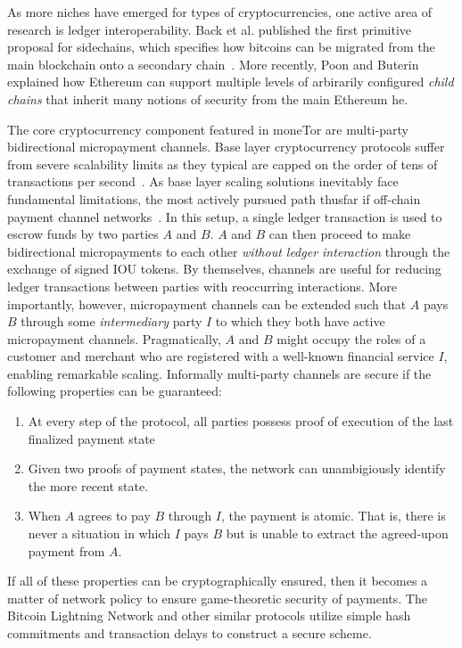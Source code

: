 As more niches have emerged for types of cryptocurrencies, one active area of
research is ledger interoperability. Back et al. published the first primitive
proposal for sidechains, which specifies how bitcoins can be migrated from the
main blockchain onto a secondary chain~\cite{back2014enabling}.  More recently,
Poon and Buterin explained how Ethereum can support multiple levels of
arbirarily configured \emph{child chains} that inherit many notions of security
from the main Ethereum he.

The core cryptocurrency component featured in moneTor are multi-party
bidirectional micropayment channels. Base layer cryptocurrency protocols suffer
from severe scalability limits as they typical are capped on the order of tens
of transactions per second~\cite{team2017blockchain}. As base layer scaling
solutions inevitably face fundamental limitations, the most actively pursued
path thusfar if off-chain payment channel networks~\cite{poon2016bitcoin}. In
this setup, a single ledger transaction is used to escrow funds by two parties
$A$ and $B$. $A$ and $B$ can then proceed to make bidirectional micropayments to
each other \emph{without ledger interaction} through the exchange of signed IOU
tokens. By themselves, channels are useful for reducing ledger transactions
between parties with reoccurring interactions. More importantly, however,
micropayment channels can be extended such that $A$ pays $B$ through some
\emph{intermediary} party $I$ to which they both have active micropayment
channels. Pragmatically, $A$ and $B$ might occupy the roles of a customer and
merchant who are registered with a well-known financial service $I$, enabling
remarkable scaling. Informally multi-party channels are secure if the following
properties can be guaranteed:

\begin{enumerate}
\item At every step of the protocol, all parties possess proof of execution of
  the last finalized payment state
\item Given two proofs of payment states, the network can unambigiously identify
  the more recent state.
\item When $A$ agrees to pay $B$ through $I$, the payment is atomic. That is,
  there is never a situation in which $I$ pays $B$ but is unable to extract the
  agreed-upon payment from $A$.
\end{enumerate}

If all of these properties can be cryptographically ensured, then it becomes a
matter of network policy to ensure game-theoretic security of payments.  The
Bitcoin Lightning Network and other similar protocols utilize simple hash
commitments and transaction delays to construct a secure scheme.

